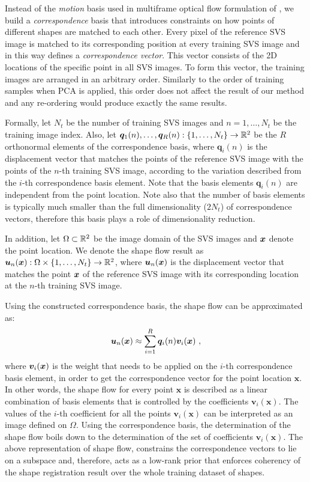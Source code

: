 Instead of the \emph{motion} basis used in multiframe optical flow formulation of \cite{Garg:2013hu}, we build a \emph{correspondence} basis that introduces constraints on how points of different shapes are matched to each other. Every pixel of the reference SVS image is matched to its corresponding position at every training SVS image and in this way defines a \emph{correspondence vector}. This vector consists of the 2D locations of the specific point in all SVS images. To form this vector, the training images are arranged in an arbitrary order. Similarly to the order of training samples when PCA is applied, this order does not affect the result of our method and any re-ordering would produce exactly the same results.


Formally, let $N_t$ be the number of training SVS images and $n=1,\ldots,N_t$ be the training image index. Also, let $\boldsymbol{q}_1(n),\ldots,\boldsymbol{q}_R(n):
\{1,\ldots,N_t\} \rightarrow \mathbb{R}^2$ be the $R$ orthonormal elements of the correspondence basis, where $\boldsymbol{q}_i(n)$ is the displacement vector that matches the points of the reference SVS image with the points of the $n$-th training SVS image, according to the variation described from the $i$-th correspondence basis element. Note that the basis elements $\boldsymbol{q}_i(n)$ are independent from the point location. Note also that the number of basis elements is typically much smaller than the full dimensionality ($2 N_t$) of correspondence vectors, therefore this basis plays a role of dimensionality reduction.


In addition, let $\Omega \subset \mathbb{R}^2$ be the image domain of the SVS images and $\boldsymbol{x}$ denote the point location. We denote the shape flow result as $\bm{u}_n(\boldsymbol{x}):\Omega\times \{1,\ldots,N_t\}
\rightarrow \mathbb{R}^2$,  where $\bm{u}_n(\boldsymbol{x})$ is the displacement vector that matches the point $\boldsymbol{x}$ of the reference SVS image with its corresponding location at the $n$-th training SVS image.

Using the constructed correspondence basis, the shape flow can be approximated as:
\begin{equation}\label{eq:LinTrajModel}
    \bm{u}_n(\boldsymbol{x}) \approx
    \sum_{i=1}^R\bm{q}_i(n)\bm{v}_i(\boldsymbol{x}) \,\, ,
\end{equation}
where $\bm{v}_i(\boldsymbol{x})$ is the weight that needs to be applied on the $i$-th correspondence basis element, in order to get the correspondence vector for the point location $\bm{x}$. In other words, the shape flow for every point $\bm{x}$ is described as a linear combination of basis elements that is controlled by the coefficients $\bm{v}_i(\bm{x})$.
The values of the $i$-th coefficient for all the points $\bm{v}_i(\bm{x})$ can be interpreted as an image defined on $\Omega$. Using the correspondence basis, the determination of the shape flow boils down to the determination of the set of coefficients $\bm{v}_i(\bm{x})$. The above representation of shape flow, constrains the correspondence vectors to lie on a subspace and, therefore, acts as a low-rank prior that enforces coherency of the shape registration result over the whole training dataset of shapes.


